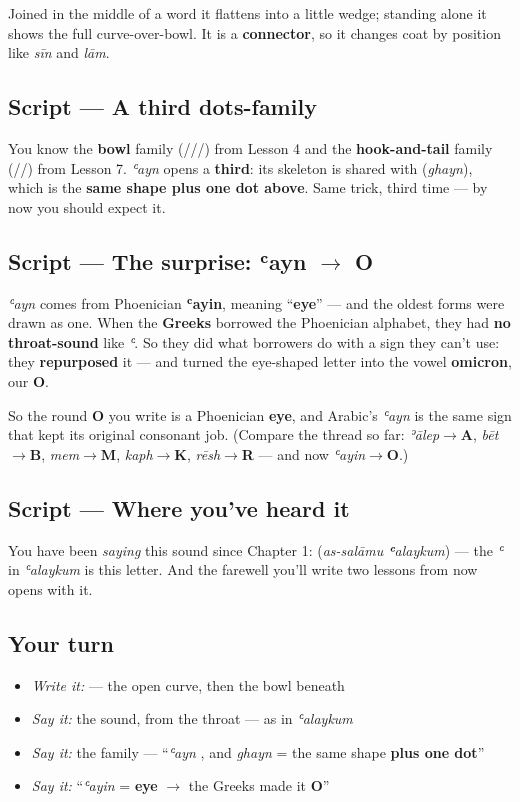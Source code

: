 Joined in the middle of a word it flattens into a little wedge; standing alone it shows the full curve-over-bowl. It is a \textbf{connector}, so it changes coat by position like \emph{sīn} and \emph{lām}.

\subsection*{Script — A third dots-family}
You know the \textbf{bowl} family (///) from Lesson 4 and the \textbf{hook-and-tail} family (//) from Lesson 7. \emph{ʿayn} opens a \textbf{third}: its skeleton is shared with \textbf{} (\emph{ghayn}), which is the \textbf{same shape plus one dot above}. Same trick, third time — by now you should expect it.

\subsection*{Script — The surprise: ʿayn $\to$ O}
\emph{ʿayn} comes from Phoenician \textbf{ʿayin}, meaning \textquotedblleft{}\textbf{eye}\textquotedblright{} — and the oldest forms were drawn as one. When the \textbf{Greeks} borrowed the Phoenician alphabet, they had \textbf{no throat-sound} like \emph{ʿ}. So they did what borrowers do with a sign they can't use: they \textbf{repurposed} it — and turned the eye-shaped letter into the vowel \textbf{omicron}, our \textbf{O}.

So the round \textbf{O} you write is a Phoenician \textbf{eye}, and Arabic's \emph{ʿayn} is the same sign that kept its original consonant job. (Compare the thread so far: \emph{ʾālep}$\to$\textbf{A}, \emph{bēt}$\to$\textbf{B}, \emph{mem}$\to$\textbf{M}, \emph{kaph}$\to$\textbf{K}, \emph{rēsh}$\to$\textbf{R} — and now \emph{ʿayin}$\to$\textbf{O}.)

\subsection*{Script — Where you've heard it}
You have been \emph{saying} this sound since Chapter 1: \textbf{ } (\emph{as-salāmu \textbf{ʿ}alaykum}) — the \emph{ʿ} in \emph{ʿalaykum} is this letter. And the farewell you'll write two lessons from now opens with it.

\subsection*{Your turn}
\begin{itemize}
\raggedright
  \item \emph{Write it:} \textbf{} — the open curve, then the bowl beneath
  \item \emph{Say it:} the sound, from the throat — as in \emph{ʿalaykum}
  \item \emph{Say it:} the family — \textquotedblleft{}\emph{ʿayn} , and \emph{ghayn}  = the same shape \textbf{plus one dot}\textquotedblright{}
  \item \emph{Say it:} \textquotedblleft{}\emph{ʿayin} = \textbf{eye} $\to$ the Greeks made it \textbf{O}\textquotedblright{}
\end{itemize}

